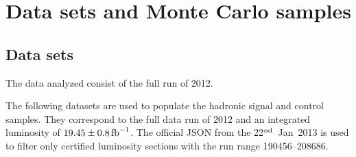 \clearpage
\section{Data sets and Monte Carlo samples\label{sec:samples}}

\subsection{Data sets\label{sec:datasets}}

The data analyzed consist of the full run of 2012.  

  
The following datasets are used to populate the hadronic signal and
control samples. They correspond to the full data run of 2012 and an
integrated luminosity of $19.45 \pm 0.8\mbox{\ensuremath{\,\text{fb}^\text{$-$1}}}$. The official JSON from
the 22$^{\rm nd}$~Jan~2013 is used to filter only certified luminosity
sections with the run range 190456--208686.

